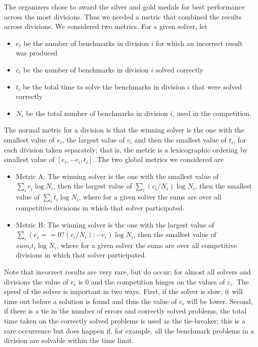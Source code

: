 \documentclass[twoside,11pt]{article}
\begin{document}
The organizers chose to award the silver and gold medals for best performance across the most divisions. Thus we needed a metric that combined the results across divisions. We considered two metrics. For a given solver, let 
\begin{itemize}[noitemsep,nolistsep]
\item $e_i$ be the number of benchmarks in division $i$ for which an incorrect result was produced
\item $c_i$ be the number of benchmarks in division $i$ solved correctly
\item $t_i$ be the total time to solve the benchmarks in division $i$ that were solved correctly
\item $N_i$ be the total number of benchmarks in division $i$, used in the competition.
\end{itemize}
The normal metric for a division is that the winning solver is the one with the
smallest value of $e_i$, the largest value of $c_i$ 
and then the smallest value of $t_i$, for each division taken separately; 
that is, the metric is a lexicographic ordering by smallest value of $[ e_i, -c_i, t_i ]$.
The two global metrics we considered are
\begin{itemize}[noitemsep,nolistsep]
\item Metric A: The winning solver is the one with the smallest value of $\sum_i e_i \log N_i$, then the largest value of $\sum_i (c_i/N_i) \log N_i$, then the smallest value of $\sum_i t_i \log N_i$, where for a given solver the sums are over all competitive divisions in which that solver participated.
\item Metric B: The winning solver is the one with the largest value of $\sum_i (e_i == 0 ? (c_i/N_i) : - e_i ) \log N_i$, then the smallest value of $sum_i t_i \log N_i$, where for a given solver the sums are over all competitive divisions in which that solver participated.
\end{itemize}
Note that incorrect results are very rare, but do occur; for almost all solvers and divisions the value of $e_i$ is 0 and the competition hinges on the values of $c_i$. The speed of the solver is important in two ways. First, if the solver is slow, it will time out before a solution is found and thus the value of $c_i$ will be lower. Second, if there is a tie in the number of errors and correctly solved problems, the total time taken on the correctly solved problems is used as the tie-breaker; this is a rare occurrence but does happen if, for example, all the benchmark problems in a division are solvable within the time limit.
\end{document}
